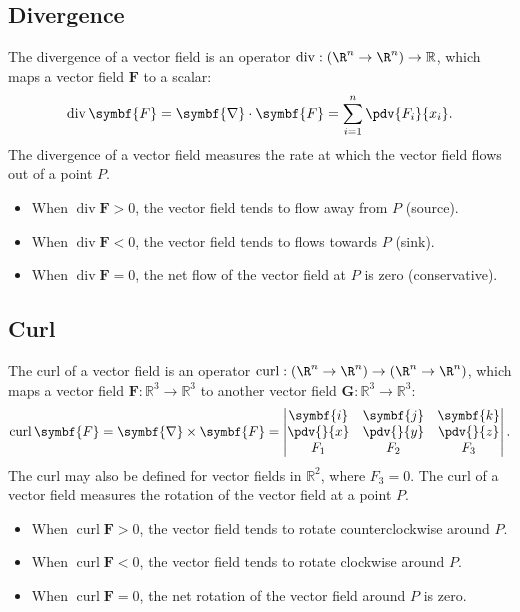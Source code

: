 \documentclass{article}
\DeclareMathOperator{\divergence}{div}
\DeclareMathOperator{\curl}{curl}
\begin{document}
\subsection{Divergence}
The divergence of a vector field is an operator \(\divergence : \left(
\R^n \to \R^n \right) \to \mathbb{R}\), which maps a vector field
\(\symbf{F}\) to a scalar:
\begin{equation*}
    \divergence \symbf{F} = \symbf{\nabla} \cdot \symbf{F} = \sum_{i=1}^{n} \pdv{F_i}{x_i}.
\end{equation*}
The divergence of a vector field measures the rate at which the vector
field flows out of a point \(P\).
\begin{itemize}
    \item When \(\divergence \symbf{F} > 0\), the vector field tends to
          flow away from \(P\) (source).
    \item When \(\divergence \symbf{F} < 0\), the vector field tends to
          flows towards \(P\) (sink).
    \item When \(\divergence \symbf{F} = 0\), the net flow of the
          vector field at \(P\) is zero (conservative).
\end{itemize}
\subsection{Curl}
The curl of a vector field is an operator \(\curl : \left( \R^n \to
\R^n \right) \to \left( \R^n \to \R^n \right)\), which maps a vector
field \(\symbf{F} : \mathbb{R}^3 \to \mathbb{R}^3\) to another vector
field \(\symbf{G} : \mathbb{R}^3 \to \mathbb{R}^3\):
\begin{equation*}
    \curl \symbf{F} = \symbf{\nabla} \times \symbf{F} =
    \begin{vmatrix}
        \symbf{i}              & \symbf{j}              & \symbf{k}              \\
        \displaystyle\pdv{}{x} & \displaystyle\pdv{}{y} & \displaystyle\pdv{}{z} \\
        F_1                    & F_2                    & F_3
    \end{vmatrix}
    .
\end{equation*}
The curl may also be defined for vector fields in \(\mathbb{R}^2\), where
\(F_3 = 0\). The curl of a vector field measures the rotation of the
vector field at a point \(P\).
\begin{itemize}
    \item When \(\curl \symbf{F} > 0\), the vector field tends to
          rotate counterclockwise around \(P\).
    \item When \(\curl \symbf{F} < 0\), the vector field tends to
          rotate clockwise around \(P\).
    \item When \(\curl \symbf{F} = 0\), the net rotation of the vector
          field around \(P\) is zero.
\end{itemize}
\end{document}
